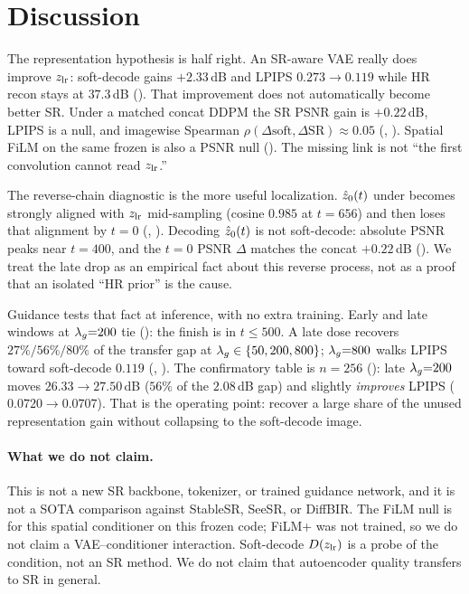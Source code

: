 \section{Discussion}
\label{sec:discussion}

The representation hypothesis is half right.
An SR-aware VAE really does improve $z_{\mathrm{lr}}$:
soft-decode gains $+2.33$\,dB and LPIPS $0.273\to 0.119$ while HR
recon stays at $37.3$\,dB ().
That improvement does not automatically become better SR.
Under a matched concat DDPM the SR PSNR gain is $+0.22$\,dB, LPIPS
is a null, and imagewise Spearman $\rho(\Delta\mathrm{soft},\Delta\mathrm{SR})\approx 0.05$
(, ).
Spatial FiLM on the same frozen \vaesr{} is also a PSNR null
().
The missing link is not ``the first convolution cannot read $z_{\mathrm{lr}}$.''

The reverse-chain diagnostic is the more useful localization.
$\hat{z}_{0}(t)$ under \vaesr{} becomes strongly aligned with $z_{\mathrm{lr}}$
mid-sampling (cosine $0.985$ at $t{=}656$) and then loses that
alignment by $t{=}0$ (, ).
Decoding $\hat{z}_{0}(t)$ is not soft-decode: absolute PSNR peaks near
$t{=}400$, and the $t{=}0$ PSNR $\Delta$ matches the concat
$+0.22$\,dB ().
We treat the late drop as an empirical fact about this reverse
process, not as a proof that an isolated ``HR prior'' is the cause.

Guidance tests that fact at inference, with no extra training.
Early and late windows at $\lambda_{g}{=}200$ tie
(): the finish is in $t\le 500$.
A late dose recovers $27\%/56\%/80\%$ of the transfer gap at
$\lambda_{g}\in\{50,200,800\}$; $\lambda_{g}{=}800$ walks LPIPS toward
soft-decode $0.119$ (, ).
The confirmatory table is $n{=}256$ ():
late $\lambda_{g}{=}200$ moves $26.33\to 27.50$\,dB ($56\%$ of the
$2.08$\,dB gap) and slightly \emph{improves} LPIPS
($0.0720\to 0.0707$).
That is the operating point: recover a large share of the unused
representation gain without collapsing to the soft-decode image.

\paragraph{What we do not claim.}
This is not a new SR backbone, tokenizer, or trained guidance
network, and it is not a SOTA comparison against StableSR, SeeSR, or
DiffBIR.
The FiLM null is for this spatial conditioner on this frozen
\vaesr{} code; FiLM+\vaeone{} was not trained, so we do not claim a
VAE--conditioner interaction.
Soft-decode $D(z_{\mathrm{lr}})$ is a probe of the condition, not an SR
method.
We do not claim that autoencoder quality transfers to SR in general.

